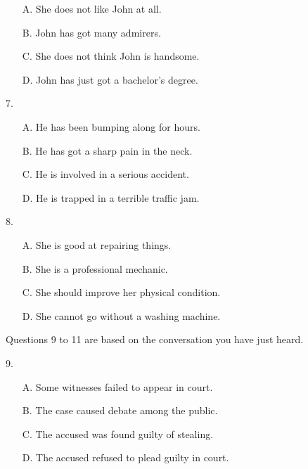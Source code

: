 \documentclass[UTF8,11pt]{ctexart}
\begin{document}
\begin{itemize}[leftmargin=2em,itemsep=.2em,topsep=.4em]\item[A.] She does not like John at all.
\item[B.] John has got many admirers.
\item[C.] She does not think John is handsome.
\item[D.] John has just got a bachelor’s degree.
\end{itemize}

7.


\begin{itemize}[leftmargin=2em,itemsep=.2em,topsep=.4em]\item[A.] He has been bumping along for hours.
\item[B.] He has got a sharp pain in the neck.
\item[C.] He is involved in a serious accident.
\item[D.] He is trapped in a terrible traffic jam.
\end{itemize}

8.


\begin{itemize}[leftmargin=2em,itemsep=.2em,topsep=.4em]\item[A.] She is good at repairing things.
\end{itemize}

\begin{itemize}[leftmargin=2em,itemsep=.2em,topsep=.4em]\item[B.] She is a professional mechanic.
\item[C.] She should improve her physical condition.
\item[D.] She cannot go without a washing machine.
\end{itemize}

Questions 9 to 11 are based on the conversation you have just heard.


9.


\begin{itemize}[leftmargin=2em,itemsep=.2em,topsep=.4em]\item[A.] Some witnesses failed to appear in court.
\item[B.] The case caused debate among the public.
\item[C.] The accused was found guilty of stealing.
\item[D.] The accused refused to plead guilty in court.
\end{itemize}
\end{document}
